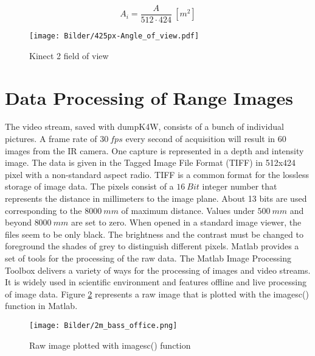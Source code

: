 \begin{equation}
A_i = \frac{A}{512\cdot 424}~[m^2]
\label{eq:pixel_area}
\end{equation}

\begin{figure}[!h]
	\centering
	\texttt{[image: Bilder/425px-Angle\_of\_view.pdf]}
	\caption{Kinect 2 field of view}
	\label{fig:FOV}
\end{figure} 


\section{Data Processing of Range Images}
The video stream, saved with dumpK4W, consists of a bunch of individual pictures. A frame rate of $30~fps$ every second of acquisition will result in 60 images from the IR camera. One capture is represented in a depth and intensity image. The data is given in the Tagged Image File Format (TIFF) in 512x424 pixel with a non-standard aspect radio. TIFF is a common format for the lossless storage of image data. The pixels consist of a $16~Bit$ integer number that represents the distance in millimeters to the image plane. About 13 bits are used corresponding to the $8000~mm$ of maximum distance. Values under $500~{mm}$ and beyond $8000~{mm}$ are set to zero. 
 When opened in a standard image viewer, the files seem to be only black. The brightness and the contrast must be changed to foreground the shades of grey to distinguish different pixels. Matlab provides a set of tools for the processing of the raw data. The Matlab Image Processing Toolbox delivers a variety of ways for the processing of images and video streams. It is widely used in scientific environment and features offline and live processing of image data. Figure \ref{fig:imagesc} represents a raw image that is plotted with the imagesc() function in Matlab.  

\begin{figure}[!h] 
	\centering
	\texttt{[image: Bilder/2m\_bass\_office.png]}
	\caption{Raw image plotted with imagesc() function}
	\label{fig:imagesc}
\end{figure}   

